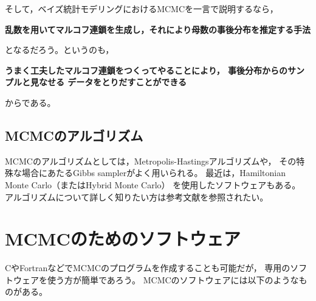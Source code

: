 \documentclass[11pt,uplatex]{jsarticle}
\begin{document}
そして，ベイズ統計モデリングにおけるMCMCを一言で説明するなら，

\vspace{2zw}
\hspace{10mm}
\begin{minipage}{110mm}
\begin{breakbox}
\noindent
{\large\bf 乱数を用いてマルコフ連鎖を生成し，それにより母数の事後分布を推定する手法}
\end{breakbox}
\end{minipage}
\vspace{2zw}

\noindent
となるだろう。というのも，

\vspace{2zw}
\hspace{10mm}
\begin{minipage}{110mm}
\begin{breakbox}
\noindent
{\large\bf うまく工夫したマルコフ連鎖をつくってやることにより，
事後分布からのサンプルと見なせる
データをとりだすことができる}
\end{breakbox}
\end{minipage}
\vspace{2zw}

\noindent
からである。


\subsection{MCMCのアルゴリズム}

MCMCのアルゴリズムとしては，Metropolis-Hastingsアルゴリズムや，
その特殊な場合にあたるGibbs samplerがよく用いられる。\cite{PRML,Iba2005,Toyoda,Watanabe}
最近は，Hamiltonian Monte Carlo（またはHybrid Monte Carlo）
\cite{PRML,BDA3,Toyoda2015,Watanabe}
を使用したソフトウェアもある。
アルゴリズムについて詳しく知りたい方は参考文献を参照されたい。


\section{MCMCのためのソフトウェア}
CやFortranなどでMCMCのプログラムを作成することも可能だが，
専用のソフトウェアを使う方が簡単であろう。
MCMCのソフトウェアには以下のようなものがある。
\end{document}

